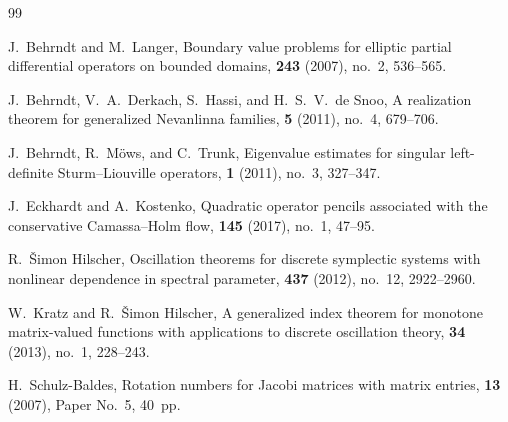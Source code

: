 \documentclass[11pt]{article}
\begin{document}
\begin{thebibliography}{99}

J.~Behrndt and M.~Langer,
\newblock Boundary value problems for elliptic partial differential operators on bounded domains,
 \textbf{243} (2007), no.~2, 536--565.

J.~Behrndt, V.~A.~Derkach, S.~Hassi, and H.~S.~V.~de Snoo,
\newblock A realization theorem for generalized Nevanlinna families,
 \textbf{5} (2011), no.~4, 679--706.

J.~Behrndt, R.~M{\"o}ws, and C.~Trunk,
\newblock Eigenvalue estimates for singular left-definite Sturm--Liouville operators,
 \textbf{1} (2011), no.~3, 327--347.

J.~Eckhardt and A.~Kostenko,
\newblock Quadratic operator pencils associated with the conservative Camassa--Holm flow,
 \textbf{145} (2017), no.~1, 47--95.

R.~{\v S}imon Hilscher,
\newblock Oscillation theorems for discrete symplectic systems with nonlinear dependence in spectral parameter,
 \textbf{437} (2012), no.~12, 2922--2960.

W.~Kratz and R.~{\v S}imon Hilscher,
\newblock A generalized index theorem for monotone matrix-valued functions with applications to discrete oscillation theory,
 \textbf{34} (2013), no.~1, 228--243.

H.~Schulz-Baldes,
\newblock Rotation numbers for Jacobi matrices with matrix entries,
 \textbf{13} (2007), Paper No.~5, 40~pp.

\end{thebibliography}
\end{document}
